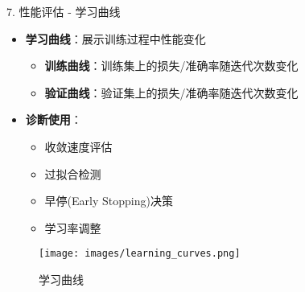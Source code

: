 \documentclass[
  ignorenonframetext,
  aspectratio=169,
  chinese-hans,
]{beamer}
\providecommand{\tightlist}{%
  \setlength{\itemsep}{0pt}\setlength{\parskip}{0pt}}\usepackage{longtable,booktabs,array}
\begin{document}
\begin{frame}{7. 性能评估 - 学习曲线}
\label{ux6027ux80fdux8bc4ux4f30---ux5b66ux4e60ux66f2ux7ebf}
\begin{itemize}
\tightlist
\item
  \textbf{学习曲线}：展示训练过程中性能变化

  \begin{itemize}
  \tightlist
  \item
    \textbf{训练曲线}：训练集上的损失/准确率随迭代次数变化
  \item
    \textbf{验证曲线}：验证集上的损失/准确率随迭代次数变化
  \end{itemize}
\item
  \textbf{诊断使用}：

  \begin{itemize}
  \tightlist
  \item
    收敛速度评估
  \item
    过拟合检测
  \item
    早停(Early Stopping)决策
  \item
    学习率调整
  \end{itemize}
\end{itemize}

\begin{figure}[H]

{\centering \texttt{[image: images/learning\_curves.png]}

}

\caption{学习曲线}

\end{figure}%
\end{frame}
\end{document}
